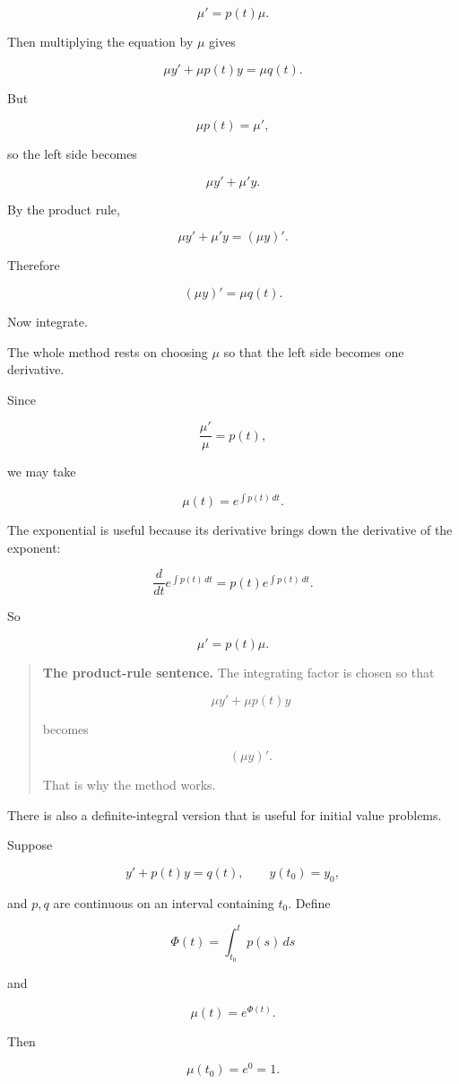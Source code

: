 \[
\mu'=p(t)\mu.
\]

Then multiplying the equation by \(\mu\) gives

\[
\mu y'+\mu p(t)y=\mu q(t).
\]

But

\[
\mu p(t)=\mu',
\]

so the left side becomes

\[
\mu y'+\mu' y.
\]

By the product rule,

\[
\mu y'+\mu' y=(\mu y)'.
\]

Therefore

\[
(\mu y)'=\mu q(t).
\]

Now integrate.

The whole method rests on choosing \(\mu\) so that the left side becomes one derivative.

Since

\[
\frac{\mu'}{\mu}=p(t),
\]

we may take

\[
\mu(t)=e^{\int p(t)\,dt}.
\]

The exponential is useful because its derivative brings down the derivative of the
exponent:

\[
\frac{d}{dt}e^{\int p(t)\,dt}
=
p(t)e^{\int p(t)\,dt}.
\]

So

\[
\mu'=p(t)\mu.
\]

\begin{quote}
\textbf{The product-rule sentence.}
The integrating factor is chosen so that

\[
\mu y'+\mu p(t)y
\]

becomes

\[
(\mu y)'.
\]

That is why the method works.
\end{quote}

There is also a definite-integral version that is useful for initial value problems.

Suppose

\[
y'+p(t)y=q(t),
\qquad
y(t_0)=y_0,
\]

and \(p,q\) are continuous on an interval containing \(t_0\).  Define

\[
\Phi(t)=\int_{t_0}^{t}p(s)\,ds
\]

and

\[
\mu(t)=e^{\Phi(t)}.
\]

Then

\[
\mu(t_0)=e^0=1.
\]

